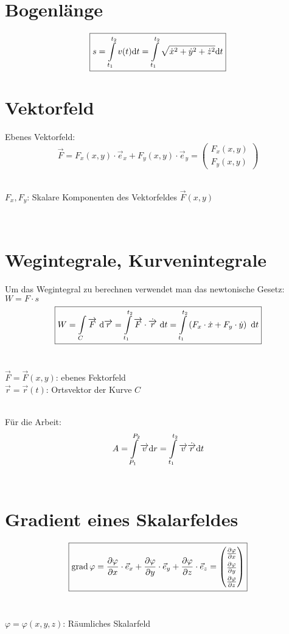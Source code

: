 \section{Bogenlänge}
\[\boxed{
	s= \int\limits_{t_1}^{t_2} v(t)\mathrm{d} t= \int\limits_{t_1}^{t_2} \sqrt{\dot{x}^2+\dot{y}^2+\dot{z}^2}\mathrm{d} t
}\]

\section{Vektorfeld}
Ebenes Vektorfeld:
\[\boxed{
	\vec{F} = F_x(x,y) \cdot \vec{e}_x + F_y(x,y) \cdot \vec{e}_y = \left( \begin{matrix}
		F_x(x,y)\\
		F_y(x,y)
	\end{matrix} \right)
}\]
\\
\begin{footnotesize}
	$F_x,F_y$: Skalare Komponenten des Vektorfeldes $\vec{F}(x,y)$
\end{footnotesize}
\\

\section{Wegintegrale, Kurvenintegrale}
Um das Wegintegral zu berechnen verwendet man das newtonische Gesetz: $W=F\cdot s$
\[\boxed{
	W=\int\limits_C \overrightarrow{F} \ \mathrm{d} \overrightarrow{r} = 
	\int\limits_{t_1}^{t_2} \overrightarrow{F}\cdot \dot{\overrightarrow{r}} \ \mathrm{d} t =
	\int\limits_{t_1}^{t_2} \left( F_x \cdot \dot{x} + F_y \cdot \dot{y} \right) \ \mathrm{d} t
}\]
\\
\begin{footnotesize}
	$\vec{F} = \vec{F}(x,y)$: ebenes Fektorfeld\\
	$\vec{r} = \vec{r}(t)$: Ortsvektor der Kurve $C$\\ 
\end{footnotesize}
\\
Für die Arbeit: 
\[
	A= \int\limits_{P_1}^{P_2}\overrightarrow{v}\mathrm{d} r= \int\limits_{t_1}^{t_2} \overrightarrow{v}\dot{\overrightarrow{r}}\mathrm{d} t
\]
\\


\section{Gradient eines Skalarfeldes}
\[\boxed{
	\renewcommand{\arraystretch}{1.4}
	\grad \varphi = \pdifrac{\varphi}{x} \cdot \vec{e}_x + \pdifrac{\varphi}{y} \cdot \vec{e}_y + \pdifrac{\varphi}{z} \cdot \vec{e}_z = 
	\left(\begin{matrix}
		\pdifrac{\varphi}{x} \\
		\pdifrac{\varphi}{y} \\
		\pdifrac{\varphi}{z}
	\end{matrix}\right)
}\]
\\
\begin{footnotesize}
	$\varphi = \varphi(x,y,z)$: Räumliches Skalarfeld
\end{footnotesize}


